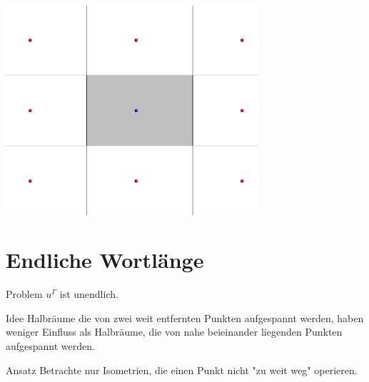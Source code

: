 \documentclass{beamer}
\theoremstyle{plain}
\newcommand{\T}{\mathcal{T}}
\begin{document}
\begin{frame}
    \centering
    \includegraphics[width=0.7\textwidth]{images/dirichlet-example.png}
\end{frame}

\section{Endliche Wortlänge}

\begin{frame}
    \begin{alertblock}{Problem}
        $u^\Gamma$ ist unendlich.
    \end{alertblock}
\end{frame}

\begin{frame}
    \begin{block}{Idee}
        Halbräume die von zwei weit entfernten Punkten aufgespannt werden, haben weniger Einfluss als Halbräume, die von nahe beieinander liegenden Punkten aufgespannt werden.
    \end{block}
    \pause
    \begin{block}{Ansatz}
        Betrachte nur Isometrien, die einen Punkt nicht "zu weit weg" operieren.
    \end{block}
\end{frame}

\end{document}
